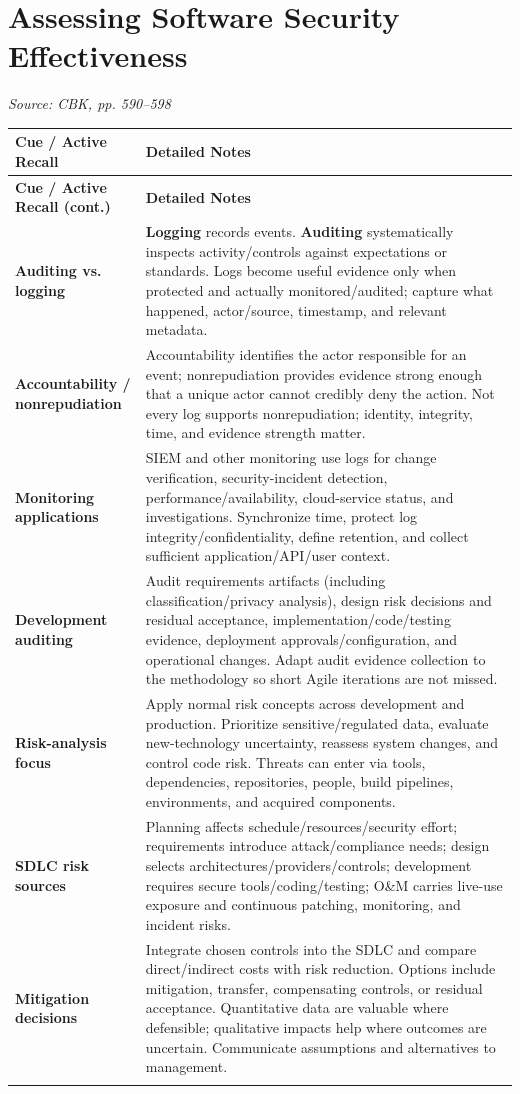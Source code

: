 \documentclass[10pt,letterpaper]{article}
\makeatletter
\newenvironment{cornell}{\rowcolors{2}{white}{notebg}\begin{longtable}{@{}>{\raggedright\arraybackslash\columncolor{cuebg}\color{navy}\bfseries}p{0.285\textwidth}>{\raggedright\arraybackslash}p{0.65\textwidth}@{}}\rowcolor{navy}\color{white}\textbf{Cue / Active Recall} & \color{white}\textbf{Detailed Notes}\\ \hline\endfirsthead\rowcolor{navy}\color{white}\textbf{Cue / Active Recall (cont.)} & \color{white}\textbf{Detailed Notes}\\ \hline\endhead}{\end{longtable}}
\newcommand{\noterow}[2]{#1 & #2\\\arrayrulecolor{line}\hline}\newcommand{\source}[1]{\par{\footnotesize\color{teal}\textit{Source: CBK, #1}}\par}
\makeatother
\begin{document}
\section{\color{navy}Assessing Software Security Effectiveness}
\source{pp. 590--598}
\begin{cornell}
\noterow{Auditing vs. logging}{\textbf{Logging} records events. \textbf{Auditing} systematically inspects activity/controls against expectations or standards. Logs become useful evidence only when protected and actually monitored/audited; capture what happened, actor/source, timestamp, and relevant metadata.}
\noterow{Accountability / nonrepudiation}{Accountability identifies the actor responsible for an event; nonrepudiation provides evidence strong enough that a unique actor cannot credibly deny the action. Not every log supports nonrepudiation; identity, integrity, time, and evidence strength matter.}
\noterow{Monitoring applications}{SIEM and other monitoring use logs for change verification, security-incident detection, performance/availability, cloud-service status, and investigations. Synchronize time, protect log integrity/confidentiality, define retention, and collect sufficient application/API/user context.}
\noterow{Development auditing}{Audit requirements artifacts (including classification/privacy analysis), design risk decisions and residual acceptance, implementation/code/testing evidence, deployment approvals/configuration, and operational changes. Adapt audit evidence collection to the methodology so short Agile iterations are not missed.}
\noterow{Risk-analysis focus}{Apply normal risk concepts across development and production. Prioritize sensitive/regulated data, evaluate new-technology uncertainty, reassess system changes, and control code risk. Threats can enter via tools, dependencies, repositories, people, build pipelines, environments, and acquired components.}
\noterow{SDLC risk sources}{Planning affects schedule/resources/security effort; requirements introduce attack/compliance needs; design selects architectures/providers/controls; development requires secure tools/coding/testing; O\&M carries live-use exposure and continuous patching, monitoring, and incident risks.}
\noterow{Mitigation decisions}{Integrate chosen controls into the SDLC and compare direct/indirect costs with risk reduction. Options include mitigation, transfer, compensating controls, or residual acceptance. Quantitative data are valuable where defensible; qualitative impacts help where outcomes are uncertain. Communicate assumptions and alternatives to management.}
\end{cornell}
\end{document}
